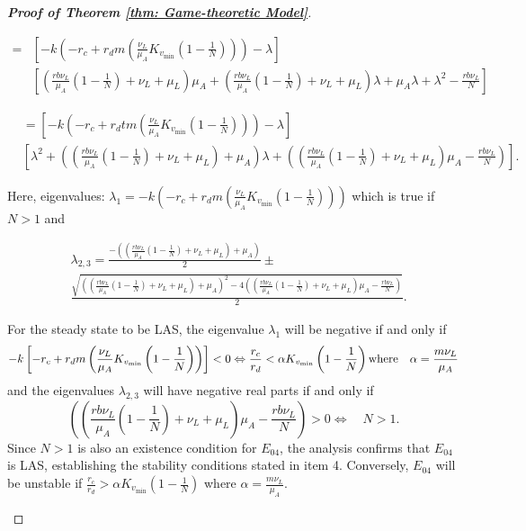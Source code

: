 \documentclass[10pt,a4paper]{amsart}
\begin{document}
\begin{proof}[\textbf{Proof of Theorem \ref{thm: Game-theoretic Model}}]
\begin{itemize}
$$
\begin{aligned}
= & {\left[-k\left(-r_c+r_d m\left(\frac{\nu_L}{\mu_A} K_{v_{\min }}\left(1-\frac{1}{{N}}\right)\right)\right)-\lambda\right] } \\
& {\left[\left(\frac{r b \nu_L}{\mu_A}\left(1-\frac{1}{{N}}\right)+\nu_L+\mu_L\right) \mu_A+\left(\frac{r b \nu_L}{\mu_A}\left(1-\frac{1}{{N}}\right)+\nu_L+\mu_L\right) \lambda+\mu_A \lambda+\lambda^2-\frac{r b \nu_L}{{N}}\right] }
\end{aligned}
$$

$$
\begin{aligned}
& =\left[-k\left(-r_c+r_d t m\left(\frac{\nu_L}{\mu_A} K_{v_{\min }}\left(1-\frac{1}{{N}}\right)\right)\right)-\lambda\right] \\
& {\left[\lambda^2+\left(\left(\frac{r b \nu_L}{\mu_A}\left(1-\frac{1}{{N}}\right)+\nu_L+\mu_L\right)+\mu_A\right) \lambda+\left(\left(\frac{r b \nu_L}{\mu_A}\left(1-\frac{1}{{N}}\right)+\nu_L+\mu_L\right) \mu_A-\frac{r b \nu_L}{{N}}\right)\right]}.
\end{aligned}
$$

Here, eigenvalues: $
\lambda_1=-k\left(-r_c+r_d m\left(\frac{\nu_L}{\mu_A} K_{v_{\min }}\left(1-\frac{1}{{N}}\right)\right)\right) 
$ which is true if $N>1$ and 

$$
\begin{aligned}
& \lambda_{2,3}=\frac{-\left(\left(\frac{r b \nu_L}{\mu_A}\left(1-\frac{1}{{N}}\right)+\nu_L+\mu_L\right)+\mu_A\right)}{2} \pm \\
& \frac{\sqrt{\left(\left(\frac{r b \nu_L}{\mu_A}\left(1-\frac{1}{{N}}\right)+\nu_L+\mu_L\right)+\mu_A\right)^2-4\left(\left(\frac{r b \nu_L}{\mu_A}\left(1-\frac{1}{{N}}\right)+\nu_L+\mu_L\right) \mu_A-\frac{r b \nu_L}{{N}}\right)}}{2}.
\end{aligned}
$$ 



For the steady state to be LAS, the eigenvalue \(\lambda_1\) will be negative if and only if
 $$
 -k\left[-r_c+r_d m\left(\frac{\nu_L}{\mu_A} K_{v_{\min }}\left(1-\frac{1}{{N}}\right)\right)\right]<0 \\
 \Leftrightarrow \frac{r_c}{r_d}<\alpha K_{v_{\min }}\left(1-\frac{1}{{N}}\right) \text {where} \quad \alpha=\frac{m\nu_L}{\mu_A}
$$
and the eigenvalues \(\lambda_{2, 3}\) will have negative real parts if and only if
$$
\left(\left(\frac{r b \nu_L}{\mu_A}\left(1-\frac{1}{{N}}\right)+\nu_L+\mu_L\right) \mu_A-\frac{r b \nu_L}{{N}}\right)>0 
\Leftrightarrow \quad {N}>1.
$$ 
 Since $N>1$ is also an existence condition for $E_{04}$, the analysis confirms that $E_{04}$ is LAS, establishing the stability conditions stated in item 4.
Conversely, $E_{04}$ will be unstable if $\frac{r_c}{r_d}>\alpha K_{v_{\min }}\left(1-\frac{1}{N}\right)$ where $\alpha=\frac{m \nu_L}{\mu_A}$.
\end{itemize}
\end{proof}
\end{document}
